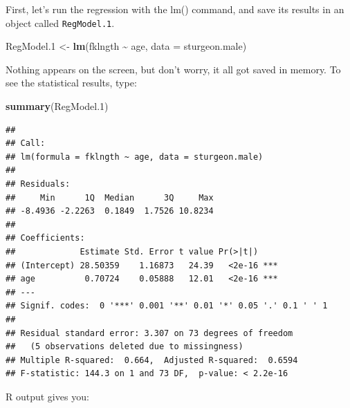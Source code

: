 \documentclass[
  12pt,
]{book}
\newenvironment{Shaded}{\begin{snugshade}}{\end{snugshade}}
\newcommand{\DataTypeTok}[1]{\textcolor[rgb]{0.13,0.29,0.53}{#1}}
\newcommand{\FloatTok}[1]{\textcolor[rgb]{0.00,0.00,0.81}{#1}}
\newcommand{\KeywordTok}[1]{\textcolor[rgb]{0.13,0.29,0.53}{\textbf{#1}}}
\newcommand{\NormalTok}[1]{#1}
\newcommand{\OperatorTok}[1]{\textcolor[rgb]{0.81,0.36,0.00}{\textbf{#1}}}
\newcommand{\StringTok}[1]{\textcolor[rgb]{0.31,0.60,0.02}{#1}}
\begin{document}
First, let's run the regression with the lm() command, and save its
results in an object called \texttt{RegModel.1}.

\begin{Shaded}
\begin{Highlighting}[]
\NormalTok{RegModel}\FloatTok{.1}\NormalTok{ \textless{}{-}}\StringTok{ }\KeywordTok{lm}\NormalTok{(fklngth }\OperatorTok{\textasciitilde{}}\StringTok{ }\NormalTok{age, }\DataTypeTok{data =}\NormalTok{ sturgeon.male)}
\end{Highlighting}
\end{Shaded}

Nothing appears on the screen, but don't worry, it all got saved in memory.
To see the statistical results, type:

\begin{Shaded}
\begin{Highlighting}[]
\KeywordTok{summary}\NormalTok{(RegModel}\FloatTok{.1}\NormalTok{)}
\end{Highlighting}
\end{Shaded}

\begin{verbatim}
## 
## Call:
## lm(formula = fklngth ~ age, data = sturgeon.male)
## 
## Residuals:
##     Min      1Q  Median      3Q     Max 
## -8.4936 -2.2263  0.1849  1.7526 10.8234 
## 
## Coefficients:
##             Estimate Std. Error t value Pr(>|t|)    
## (Intercept) 28.50359    1.16873   24.39   <2e-16 ***
## age          0.70724    0.05888   12.01   <2e-16 ***
## ---
## Signif. codes:  0 '***' 0.001 '**' 0.01 '*' 0.05 '.' 0.1 ' ' 1
## 
## Residual standard error: 3.307 on 73 degrees of freedom
##   (5 observations deleted due to missingness)
## Multiple R-squared:  0.664,  Adjusted R-squared:  0.6594 
## F-statistic: 144.3 on 1 and 73 DF,  p-value: < 2.2e-16
\end{verbatim}

R output gives you:
\end{document}
